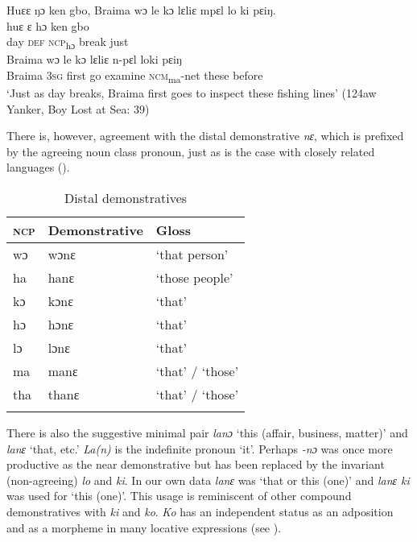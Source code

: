     \ex\label{ex:57d} Huɛɛ ŋɔ ken gbo, Braima wɔ le kɔ lɛliɛ mpɛl lo ki pɛiŋ.\\
    \gll huɛ  ɛ    hɔ      ken    gbo\\
    day  \textsc{def}  \textsc{ncp}\textsubscript{hɔ}    break    just\\
    \gll Braima  wɔ    le    kɔ    lɛliɛ    n-pɛl      loki    pɛiŋ\\
    Braima  \textsc{3sg}  first  go    examine  \textsc{ncm}\textsubscript{ma}{}-net  these    before\\
    \glt ‘Just as day breaks, Braima first goes to inspect these fishing lines' (124aw Yanker, Boy Lost at Sea: 39)
\z
\z

There is, however, agreement with the distal demonstrative \textit{nɛ}, which is prefixed by the agreeing noun class pronoun, just as is the case with closely related languages ().

\begin{table}
\caption{\label{tab:wordcat:16}Distal demonstratives}

\begin{tabular}{lll}
\lsptoprule
\textsc{ncp} & Demonstrative & Gloss\\
\midrule
wɔ & wɔnɛ & ‘that person'\\
ha & hanɛ & ‘those people'\\
kɔ & kɔnɛ & ‘that'\\
hɔ & hɔnɛ & ‘that'\\
lɔ & lɔnɛ & ‘that'\\
ma & manɛ & ‘that' / ‘those'\\
tha & thanɛ & ‘that' / ‘those'\\
\lspbottomrule
\end{tabular}
\end{table}

There is also the suggestive minimal pair \textit{lanɔ} ‘this (affair, business, matter)' and \textit{lanɛ} ‘that, etc.' \textit{La(n)} is the indefinite pronoun ‘it'. Perhaps \textit{{}-nɔ} was once more productive as the near demonstrative but has been replaced by the invariant (non-agreeing) \textit{lo} and \textit{ki}. In our own data \textit{lanɛ} was ‘that or this (one)' and \textit{lanɛ ki} was used for ‘this (one)'. This usage is reminiscent of other compound demonstratives with \textit{ki} and \textit{ko}. \textit{Ko} has an independent status as an adposition and as a morpheme in many locative expressions (see ).

